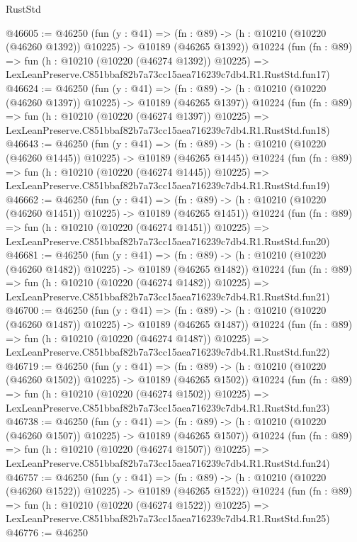 \begin{lexlean}{RustStd}
\begin{coremodule}
@46605 := @46250
    (fun (y : @41) =>
    (fn : @89) -> (h : @10210 (@10220 (@46260 @1392)) @10225) -> @10189 (@46265 @1392))
    @10224
    (fun (fn : @89) =>
    fun (h : @10210 (@10220 (@46274 @1392)) @10225) =>
    LexLeanPreserve.C851bbaf82b7a73cc15aea716239c7db4.R1.RustStd.fun17)
@46624 := @46250
    (fun (y : @41) =>
    (fn : @89) -> (h : @10210 (@10220 (@46260 @1397)) @10225) -> @10189 (@46265 @1397))
    @10224
    (fun (fn : @89) =>
    fun (h : @10210 (@10220 (@46274 @1397)) @10225) =>
    LexLeanPreserve.C851bbaf82b7a73cc15aea716239c7db4.R1.RustStd.fun18)
@46643 := @46250
    (fun (y : @41) =>
    (fn : @89) -> (h : @10210 (@10220 (@46260 @1445)) @10225) -> @10189 (@46265 @1445))
    @10224
    (fun (fn : @89) =>
    fun (h : @10210 (@10220 (@46274 @1445)) @10225) =>
    LexLeanPreserve.C851bbaf82b7a73cc15aea716239c7db4.R1.RustStd.fun19)
@46662 := @46250
    (fun (y : @41) =>
    (fn : @89) -> (h : @10210 (@10220 (@46260 @1451)) @10225) -> @10189 (@46265 @1451))
    @10224
    (fun (fn : @89) =>
    fun (h : @10210 (@10220 (@46274 @1451)) @10225) =>
    LexLeanPreserve.C851bbaf82b7a73cc15aea716239c7db4.R1.RustStd.fun20)
@46681 := @46250
    (fun (y : @41) =>
    (fn : @89) -> (h : @10210 (@10220 (@46260 @1482)) @10225) -> @10189 (@46265 @1482))
    @10224
    (fun (fn : @89) =>
    fun (h : @10210 (@10220 (@46274 @1482)) @10225) =>
    LexLeanPreserve.C851bbaf82b7a73cc15aea716239c7db4.R1.RustStd.fun21)
@46700 := @46250
    (fun (y : @41) =>
    (fn : @89) -> (h : @10210 (@10220 (@46260 @1487)) @10225) -> @10189 (@46265 @1487))
    @10224
    (fun (fn : @89) =>
    fun (h : @10210 (@10220 (@46274 @1487)) @10225) =>
    LexLeanPreserve.C851bbaf82b7a73cc15aea716239c7db4.R1.RustStd.fun22)
@46719 := @46250
    (fun (y : @41) =>
    (fn : @89) -> (h : @10210 (@10220 (@46260 @1502)) @10225) -> @10189 (@46265 @1502))
    @10224
    (fun (fn : @89) =>
    fun (h : @10210 (@10220 (@46274 @1502)) @10225) =>
    LexLeanPreserve.C851bbaf82b7a73cc15aea716239c7db4.R1.RustStd.fun23)
@46738 := @46250
    (fun (y : @41) =>
    (fn : @89) -> (h : @10210 (@10220 (@46260 @1507)) @10225) -> @10189 (@46265 @1507))
    @10224
    (fun (fn : @89) =>
    fun (h : @10210 (@10220 (@46274 @1507)) @10225) =>
    LexLeanPreserve.C851bbaf82b7a73cc15aea716239c7db4.R1.RustStd.fun24)
@46757 := @46250
    (fun (y : @41) =>
    (fn : @89) -> (h : @10210 (@10220 (@46260 @1522)) @10225) -> @10189 (@46265 @1522))
    @10224
    (fun (fn : @89) =>
    fun (h : @10210 (@10220 (@46274 @1522)) @10225) =>
    LexLeanPreserve.C851bbaf82b7a73cc15aea716239c7db4.R1.RustStd.fun25)
@46776 := @46250

\end{coremodule}
\end{lexlean}
